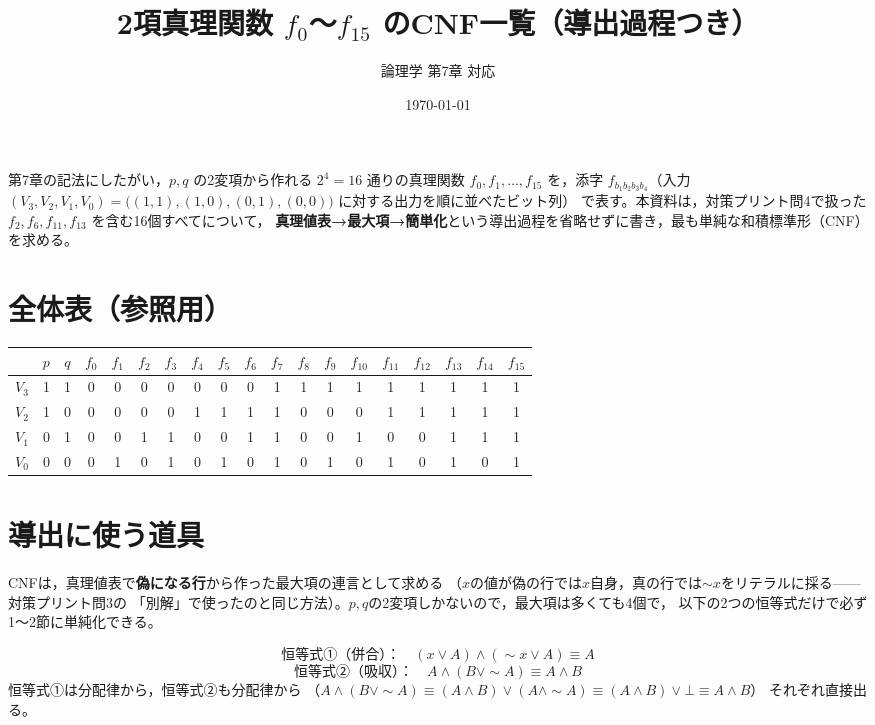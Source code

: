 \documentclass[autodetect-engine,dvi=dvipdfmx,ja=standard]{bxjsarticle}
\title{2項真理関数 \(f_0\)〜\(f_{15}\) のCNF一覧（導出過程つき）}
\author{論理学 第7章 対応}
\date{\today}
\begin{document}
\maketitle

第7章の記法にしたがい，\(p,q\) の2変項から作れる \(2^4=16\) 通りの真理関数
\(f_0,f_1,\ldots,f_{15}\) を，添字 \(f_{b_1b_2b_3b_4}\)（入力
\((V_3,V_2,V_1,V_0)=\bigl((1,1),(1,0),(0,1),(0,0)\bigr)\) に対する出力を順に並べたビット列）
で表す。本資料は，対策プリント問4で扱った \(f_2,f_6,f_{11},f_{13}\) を含む16個すべてについて，
\textbf{真理値表→最大項→簡単化}という導出過程を省略せずに書き，最も単純な和積標準形（CNF）を求める。

\section{全体表（参照用）}

\begin{center}
\scriptsize
\setlength{\tabcolsep}{3pt}
\begin{tabular}{c|cc|cccccccccccccccc}
\toprule
 & \(p\) & \(q\)
 & \(f_0\) & \(f_1\) & \(f_2\) & \(f_3\) & \(f_4\) & \(f_5\) & \(f_6\) & \(f_7\)
 & \(f_8\) & \(f_9\) & \(f_{10}\) & \(f_{11}\) & \(f_{12}\) & \(f_{13}\) & \(f_{14}\) & \(f_{15}\)
\\
\midrule
\(V_3\) & 1 & 1 & 0&0&0&0&0&0&0&1&1&1&1&1&1&1&1&1 \\
\(V_2\) & 1 & 0 & 0&0&0&0&1&1&1&1&0&0&0&1&1&1&1&1 \\
\(V_1\) & 0 & 1 & 0&0&1&1&0&0&1&1&0&0&1&0&0&1&1&1 \\
\(V_0\) & 0 & 0 & 0&1&0&1&0&1&0&1&0&1&0&1&0&1&0&1 \\
\bottomrule
\end{tabular}
\end{center}

\section{導出に使う道具}

CNFは，真理値表で\textbf{偽になる行}から作った最大項の連言として求める
（\(x\)の値が偽の行では\(x\)自身，真の行では\(\sim x\)をリテラルに採る——対策プリント問3の
「別解」で使ったのと同じ方法）。\(p,q\)の2変項しかないので，最大項は多くても4個で，
以下の2つの恒等式だけで必ず1〜2節に単純化できる。

\[
  \text{恒等式①（併合）：}\quad(x\lor A)\land(\sim x\lor A)\equiv A
\]
\[
  \text{恒等式②（吸収）：}\quad A\land(B\lor\sim A)\equiv A\land B
\]
恒等式①は分配律から，恒等式②も分配律から
（\(A\land(B\lor\sim A)\equiv(A\land B)\lor(A\land\sim A)\equiv(A\land B)\lor\bot\equiv A\land B\)）
それぞれ直接出る。
\end{document}
